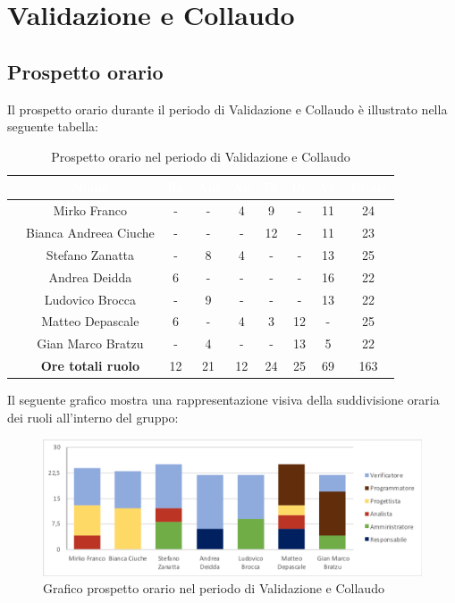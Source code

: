 \newpage
\section{Validazione e Collaudo}
\subsection{Prospetto orario}
Il prospetto orario durante il periodo di Validazione e Collaudo è illustrato nella seguente tabella:

\begin{table}[ht]
	\begin{center}
		\begin{tabular}{ccccccccc}
			\rowcolor{coolblack}
			\hline
			& \textcolor{white}{Nome} & \textcolor{white}{Re} & \textcolor{white}{Am} & \textcolor{white}{An} & \textcolor{white}{Pt} &\textcolor{white}{Pr} & \textcolor{white}{Ve} & \textcolor{white}{Totale} \\
			\hline
			&Mirko Franco & - & - & 4 & 9& - & 11 & 24  \\
			&Bianca Andreea Ciuche & -& -& - & 12 & - & 11 & 23 \\
			&Stefano Zanatta & - & 8& 4 & - & - & 13 & 25 \\
			&Andrea Deidda &  6& - & - & - & - & 16 & 22 \\
			&Ludovico Brocca & -& 9 & - & - & - & 13 & 22 \\
			&Matteo Depascale & 6& -& 4 & 3& 12& -& 25 \\
			&Gian Marco Bratzu & -& 4 & - & - & 13 & 5 & 22 \\
			\hline
			&\textbf{Ore totali ruolo} & 12& 21 & 12 & 24 & 25 & 69 & 163 \\
		\end{tabular}
		\caption{Prospetto orario nel periodo di Validazione e Collaudo}
	\end{center}
\end{table}

Il seguente grafico mostra una rappresentazione visiva della suddivisione oraria dei ruoli all'interno del gruppo:
\begin{figure}[!ht]
	\begin{center}
		\includegraphics[scale=0.80]{images/grafoValidazioneCollaudo.png}
		\caption{Grafico prospetto orario nel periodo di Validazione e Collaudo}
	\end{center}
\end{figure}


